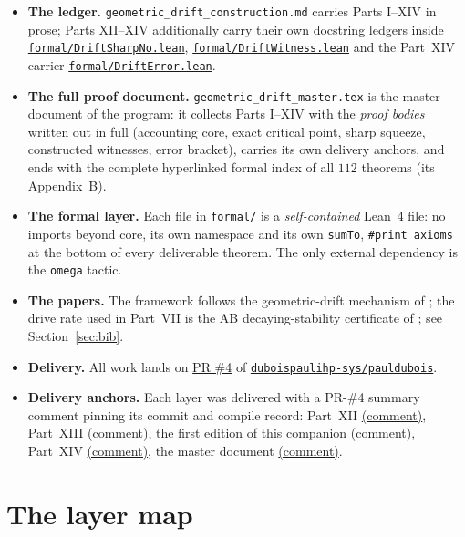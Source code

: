 \documentclass[11pt]{article}
\begin{document}
\begin{itemize}
\item \textbf{The ledger.} \texttt{geometric\_drift\_construction.md} carries Parts I--XIV in
prose; Parts XII--XIV additionally carry their own docstring ledgers inside
\hyperref[sec:sharp]{\texttt{formal/DriftSharpNo.lean}},
\hyperref[sec:witness]{\texttt{formal/DriftWitness.lean}} and the Part~XIV carrier
\hyperref[sec:bracket]{\texttt{formal/DriftError.lean}}.
\item \textbf{The full proof document.} \texttt{geometric\_drift\_master.tex} is the master
document of the program: it collects Parts I--XIV with the \emph{proof bodies} written out
in full (accounting core, exact critical point, sharp squeeze, constructed witnesses,
error bracket), carries its own delivery anchors, and ends with the complete hyperlinked
formal index of all $112$ theorems (its Appendix~B).
\item \textbf{The formal layer.} Each file in \texttt{formal/} is a \emph{self-contained}
Lean~4 file: no imports beyond core, its own namespace and its own \texttt{sumTo},
\texttt{\#print axioms} at the bottom of every deliverable theorem. The only external
dependency is the \texttt{omega} tactic.
\item \textbf{The papers.} The framework follows the geometric-drift mechanism of
\cite{dubois}; the drive rate used in Part~VII is the AB decaying-stability certificate of
\cite{blowup}; see Section~\ref{sec:bib}.
\item \textbf{Delivery.} All work lands on
\href{https://github.com/duboispaulihp-sys/pauldubois/pull/4}{PR \#4} of
\href{https://github.com/duboispaulihp-sys/pauldubois}{\texttt{duboispaulihp-sys/pauldubois}}.
\item \textbf{Delivery anchors.} Each layer was delivered with a PR-\#4 summary comment
pinning its commit and compile record: Part~XII
\href{https://github.com/duboispaulihp-sys/pauldubois/pull/4#issuecomment-7063578517}{(comment)},
Part~XIII
\href{https://github.com/duboispaulihp-sys/pauldubois/pull/4#issuecomment-7064107266}{(comment)},
the first edition of this companion
\href{https://github.com/duboispaulihp-sys/pauldubois/pull/4#issuecomment-7064375359}{(comment)},
Part~XIV
\href{https://github.com/duboispaulihp-sys/pauldubois/pull/4#issuecomment-7064852773}{(comment)},
the master document
\href{https://github.com/duboispaulihp-sys/pauldubois/pull/4#issuecomment-7065062543}{(comment)}.
\end{itemize}

\section{The layer map}\label{sec:map}
\end{document}
